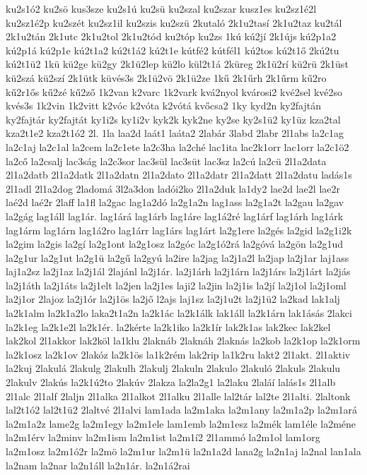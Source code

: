 {ku2s1ó2
ku2sö
kus3sze
ku2s1ú
ku2sü
ku2szal
ku2szar
kusz1es
ku2sz1é2l
ku2sz1é2p
ku2szét
ku2sz1il
ku2szis
ku2szü
2kutaló
2k1u2tasí
2k1u2taz
ku2tál
2k1u2tán
2k1utc
2k1u2tol
2k1u2tód
ku2tóp
ku2zs
1kú
kú2jí
2k1újs
kú2p1a2
kú2p1á
kú2p1e
kú2t1a2
kú2t1á2
kú2t1e
kútfé2
kútfél1
kú2tos
kú2t1ő
2kú2tu
kú2t1ü2
1kü
kü2ge
kü2gy
2k1ü2lep
kü2lo
kül2t1á
2küreg
2k1ü2rí
kü2rü
2k1üst
kü2szá
kü2szí
2k1ütk
küvés3s
2k1ü2vö
2k1ü2ze
1kű
2k1űrh
2k1űrm
kű2ro
kű2r1ős
kű2zé
kű2ző
1k2van
k2varc
1k2vark
kvá2nyol
kvárosi2
kvé2sel
kvé2so
kvés3s
1k2vin
1k2vitt
k2vóc
k2vóta
k2vótá
kvőcsa2
1ky
kyd2n
ky2fajtán
ky2fajtár
ky2fajtát
ky1i2s
ky1i2v
kyk2k
kyk2ne
ky2se
ky2s1ü2
ky1üz
kza2tal
kza2t1e2
kza2t1ó2
2l.
1la
laa2d
laát1
laáta2
2labár
3labd
2labr
2l1abs
la2c1ag
la2c1aj
la2c1al
la2cem
la2c1ete
la2c3ha
la2ché
lac1ita
lac2k1orr
lac1orr
la2c1ö2
la2cő
la2csalj
lac3ság
la2c3sor
lac3sül
lac3süt
lac3sz
la2cú
la2cü
2l1a2data
2l1a2datb
2l1a2datk
2l1a2datn
2l1a2dato
2l1a2datr
2l1a2datt
2l1a2datu
ladás1s
2l1adl
2l1a2dog
2ladomá
3l2a3don
ladói2ko
2l1a2duk
la1dy2
lae2d
lae2l
lae2r
laé2d
laé2r
2laff
la1fl
la2gac
lag1a2dó
la2g1a2n
lag1ass
la2g1a2t
la2gau
la2gav
la2gág
lag1áll
lag1ár.
lag1árá
lag1árb
lag1áre
lag1á2ré
lag1árf
lag1árh
lag1árk
lag1árm
lag1árn
lag1á2ro
lag1árr
lag1árs
lag1árt
la2g1ere
la2gés
la2gid
la2g1i2k
la2gim
la2gis
la2gí
la2g1ont
la2g1osz
la2góc
la2g1ó2rá
la2góvá
la2gön
la2g1ud
la2g1ur
la2g1ut
la2g1ü
la2gű
la2gyú
la2ire
la2jag
la2j1a2l
la2jap
la2j1ar
laj1ass
laj1a2sz
la2j1az
la2j1ál
2lajánl
la2j1ár.
la2j1árh
la2j1árn
la2j1árs
la2j1árt
la2jás
la2j1áth
la2j1áts
la2j1elt
la2jen
la2j1es
laji2
la2jin
la2j1is
la2jí
la2j1ol
la2j1oml
la2j1or
2lajoz
la2j1ór
la2j1ös
la2jő
l2ajs
laj1sz
la2j1u2t
la2j1ü2
la2kad
lak1alj
la2k1alm
la2k1a2lo
laka2t1a2n
la2k1ác
la2k1álk
lak1áll
la2k1árn
lak1ásás
2lakci
la2k1eg
la2k1e2l
la2k1ér.
la2kérte
la2k1iko
la2k1ír
lak2k1as
lak2kec
lak2kel
lak2kol
2l1akkor
lak2köl
la1klu
2laknáb
2laknáh
2laknás
la2kob
la2k1op
la2k1orm
la2k1osz
la2k1ov
2lakóz
la2k1ös
la1k2rém
lak2rip
la1k2ru
lakt2
2l1akt.
2l1aktiv
la2kuj
2lakulá
2lakulg
2lakulh
2lakulj
2lakuln
2lakulo
2lakuló
2lakuls
2lakulu
2lakulv
2lakús
la2k1ú2to
2lakúv
2lakza
la2la2g1
la2laku
2laláí
lalás1s
2l1alb
2l1alc
2l1alf
2laljn
2l1alka
2l1alkot
2l1alku
2l1alle
lal2tár
lal2te
2l1alti.
2laltonk
lal2t1ó2
lal2t1ü2
2laltvé
2l1alvi
lam1ada
la2m1aka
la2m1any
la2m1a2p
la2m1ará
la2m1a2z
lame2g
la2m1egy
la2m1ele
lam1emb
la2m1esz
la2mék
lam1éle
la2méne
la2m1érv
la2minv
la2m1ism
la2m1ist
la2m1í2
2l1ammó
la2m1ol
lam1org
la2m1osz
la2m1ó2r
la2mö
la2m1ur
la2m1ü
la2n1a2d
lana2g
la2n1aj
la2nal
lan1ala
la2nam
la2nar
la2n1áll
la2n1ár.
la2n1á2rai
}
